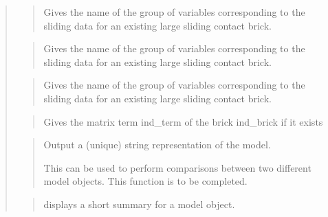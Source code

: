 \documentclass[a4paper,11pt,english]{sphinxmanual}
\begin{document}
\begin{quote}
\begin{quote}
\sphinxAtStartPar
Gives the name of the group of variables corresponding to the
sliding data for an existing large sliding contact brick.
\end{quote}

\sphinxAtStartPar
{}
\begin{quote}

\sphinxAtStartPar
Gives the name of the group of variables corresponding to the
sliding data for an existing large sliding contact brick.
\end{quote}

\sphinxAtStartPar
{}
\begin{quote}

\sphinxAtStartPar
Gives the name of the group of variables corresponding to the
sliding data for an existing large sliding contact brick.
\end{quote}

\sphinxAtStartPar
{}
\begin{quote}

\sphinxAtStartPar
Gives the matrix term ind\_term of the brick ind\_brick if it exists
\end{quote}

\sphinxAtStartPar
{}
\begin{quote}

\sphinxAtStartPar
Output a (unique) string representation of the model.

\sphinxAtStartPar
This can be used to perform comparisons between two
different model objects.
This function is to be completed.
\end{quote}

\sphinxAtStartPar
{}
\begin{quote}

\sphinxAtStartPar
displays a short summary for a model object.
\end{quote}
\end{quote}
\end{document}
